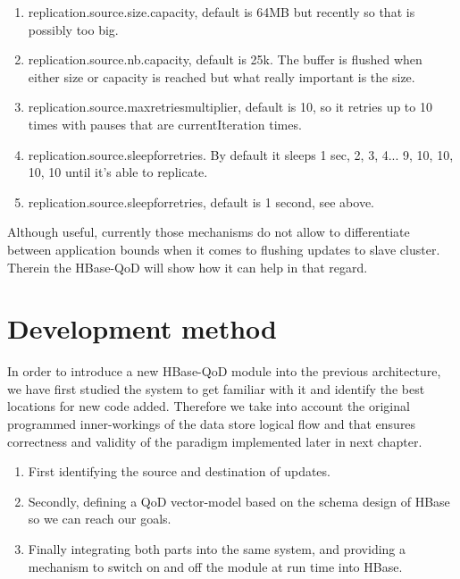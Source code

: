 \begin{enumerate}
\item replication.source.size.capacity, default is 64MB but recently so that is possibly too big.
\item replication.source.nb.capacity, default is 25k. The buffer is flushed when either size or capacity is reached but what really important is the size.
\item replication.source.maxretriesmultiplier, default is 10, so it retries up to 10 times with pauses that are currentIteration times.
\item replication.source.sleepforretries. By default it sleeps 1 sec, 2, 3, 4... 9, 10, 10, 10, 10 until it's able to replicate.
\item replication.source.sleepforretries, default is 1 second, see above.
\end{enumerate}

Although useful, currently those mechanisms do not allow to differentiate between application bounds when it comes to flushing updates to slave cluster. Therein the HBase-QoD will show how it can help in that regard.

\section{Development method}\label{method}
In order to introduce a new HBase-QoD module into the previous architecture, we have first studied the system to get familiar with it and identify the best locations for new code added. Therefore we take into account the original programmed inner-workings of the data store logical flow and that ensures correctness and validity of the paradigm implemented later in next chapter. 

\begin{enumerate}
\item First identifying the source and destination of updates.
\item Secondly, defining a QoD vector-model based on the schema design of HBase so we can reach our goals.
\item Finally integrating both parts into the same system, and providing a mechanism to switch on and off the module at run time into HBase.
\end{enumerate}

